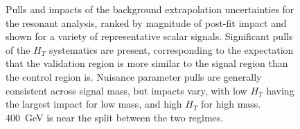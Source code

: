 \begin{figure}[ht]
  \centering


  \caption{\label{fig:res-pull-imp} Pulls and impacts of the background extrapolation uncertainties for 
  the resonant analysis, ranked by magnitude of post-fit impact and shown for a variety of representative scalar 
  signals. Significant pulls of the $H_{T}$ systematics are present, corresponding to the expectation that the 
  validation region is more similar to the signal region than the control region is. Nuisance parameter pulls 
  are generally consistent across signal mass, but impacts vary, with low $H_{T}$ having the largest impact 
  for low mass, and high $H_{T}$ for high mass. \SI{400}{\GeV} is near the split between the two regimes.}
\end{figure}

